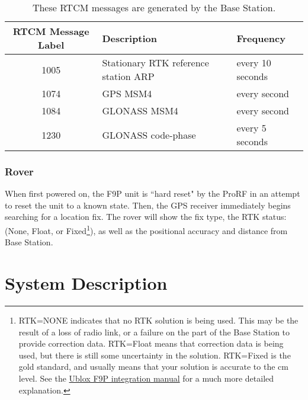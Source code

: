 \documentclass{article}%
\begin{document}
\begin{table}[]
\centering
\begin{tabular}{|cll|}
\hline
\multicolumn{1}{|c|}{\textbf{RTCM Message Label}} & \multicolumn{1}{l|}{\textbf{Description}} & \textbf{Frequency} \\ \hline
1005 & Stationary RTK reference station ARP & every 10 seconds \\
1074 & GPS MSM4 & every second \\
1084 & GLONASS MSM4 & every second \\
1230 & GLONASS code-phase & every 5 seconds \\ \hline
\end{tabular}
\caption{These RTCM messages are generated by the Base Station.}
\label{tab:enabled-rtcm}
\end{table}

\subsubsection{Rover}
When first powered on, the F9P unit is ``hard reset" by the ProRF in an attempt to reset the unit to a known state. Then, the GPS receiver immediately begins searching for a location fix.  The rover will show the fix type, the RTK status: (None, Float, or Fixed\footnote{RTK=NONE indicates that no RTK solution is being used.  This may be the result of a loss of radio link, or a failure on the part of the Base Station to provide correction data.  RTK=Float means that correction data is being used, but there is still some uncertainty in the solution.  RTK=Fixed is the gold standard, and usually means that your solution is accurate to the cm level.  See the \href{https://www.u-blox.com/sites/default/files/ZED-F9P_IntegrationManual_\%28UBX-18010802\%29.pdf}{Ublox F9P integration manual} for a much more detailed explanation.}), as well as the positional accuracy and distance from Base Station.

\section{System Description}
\end{document}
